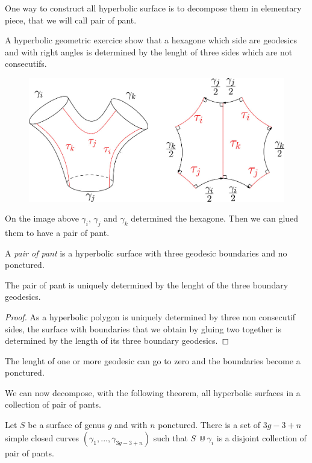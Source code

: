 One way to construct all hyperbolic surface is to decompose them in elementary piece, that we will call pair of pant.

A hyperbolic geometric exercice show that a hexagone which side are geodesics and with right angles is determined by the lenght of three sides which are not consecutifs.

\begin{figure}[!h]
\centering
\includegraphics[width=12cm]{Image/PairOfPant.jpg}
\end{figure}

 On the image above $\gamma_i$, $\gamma_j$ and $\gamma_k$ determined the hexagone. Then we can glued them to have a pair of pant.

 \begin{dfnt}
 A \emph{pair of pant} is a hyperbolic surface with three geodesic boundaries and no ponctured.
 \end{dfnt}

\begin{rmq}
The pair of pant is uniquely determined by the lenght of the three boundary geodesics.
\end{rmq}

\begin{proof}
As a hyperbolic polygon is uniquely determined by three non consecutif sides, the surface with boundaries that we obtain by gluing two together is determined by the length of its three boundary geodesics.
\end{proof}

\begin{rmq}
The lenght of one or more geodesic can go to zero and the boundaries become a ponctured.
\end{rmq}

We can now decompose, with the following theorem, all hyperbolic surfaces in a collection of pair of pants.

\begin{thm}
Let $S$ be a surface of genus $g$ and with $n$ ponctured. There is a set of $3g-3+n$ simple closed curves $(\gamma_1,...,\gamma_{3g-3+n})$ such that $S\ \Cup \gamma_i$ is a disjoint collection of pair of pants.
\end{thm}

